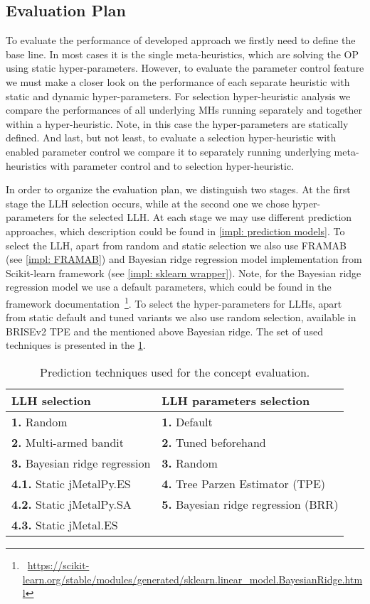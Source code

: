 \subsection{Evaluation Plan}\label{eval:1:plan}
To evaluate the performance of developed approach we firstly need to define the base line. In most cases it is the single meta-heuristics, which are solving the OP using static hyper-parameters. However, to evaluate the parameter control feature we must make a closer look on the performance of each separate heuristic with static and dynamic hyper-parameters. For selection hyper-heuristic analysis we compare the performances of all underlying MHs running separately and together within a hyper-heuristic. Note, in this case the hyper-parameters are statically defined. And last, but not least, to evaluate a selection hyper-heuristic with enabled parameter control we compare it to separately running underlying meta-heuristics with parameter control and to selection hyper-heuristic.

In order to organize the evaluation plan, we distinguish two stages.
At the first stage the LLH selection occurs, while at the second one we chose hyper-parameters for the selected LLH. At each stage we may use different prediction approaches, which description could be found in \cref{impl: prediction models}. To select the LLH, apart from random and static selection we also use FRAMAB (see \cref{impl: FRAMAB}) and Bayesian ridge regression model implementation from Scikit-learn framework (see \cref{impl: sklearn wrapper}). Note, for the Bayesian ridge regression model we use a default parameters, which could be found in the framework documentation~\footnote{~\url{https://scikit-learn.org/stable/modules/generated/sklearn.linear_model.BayesianRidge.html}}. To select the hyper-parameters for LLHs, apart from static default and tuned variants we also use random selection, available in BRISEv2 TPE and the mentioned above Bayesian ridge. The set of used techniques is presented in the \cref{eval: concept settings table}.
\begin{table}[h!]
	\centering
	\begin{tabular}{l||l}
		\textbf{LLH selection} & \textbf{LLH parameters selection} \\
		\hline
		\hline
		\textbf{1.} Random & \textbf{1.} Default \\
		\textbf{2.} Multi-armed bandit & \textbf{2.} Tuned beforehand \\
		\textbf{3.} Bayesian ridge regression & \textbf{3.} Random \\
		\textbf{4.1.} Static jMetalPy.ES & \textbf{4.} Tree Parzen Estimator (TPE) \\
		\textbf{4.2.} Static jMetalPy.SA & \textbf{5.} Bayesian ridge regression (BRR) \\
		\textbf{4.3.} Static jMetal.ES & 
	\end{tabular}
	
	\caption{Prediction techniques used for the concept evaluation.}
	\label{eval: concept settings table}
\end{table}


